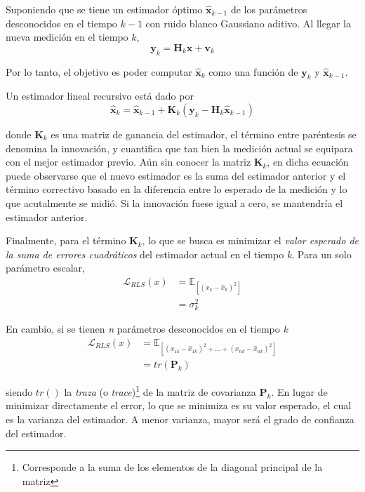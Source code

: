 Suponiendo que se tiene un estimador óptimo $\hat{\bm{x}}_{k-1}$ de los parámetros desconocidos en el tiempo $k-1$ con ruido blanco Gaussiano aditivo. Al llegar la nueva medición en el tiempo $k$,
\begin{equation}
    \bm{y}_k = \bm{H}_k \bm{x} + \bm{v}_k
\end{equation}

Por lo tanto, el objetivo es poder computar $\hat{\bm{x}}_k$ como una función de $\bm{y}_k$ y $\hat{\bm{x}}_{k-1}$.

Un estimador lineal recursivo está dado por
\begin{equation}
    \hat{\bm{x}}_k = \hat{\bm{x}}_{k-1} + \bm{K}_k (\bm{y}_k - \bm{H}_k \hat{\bm{x}}_{k-1})
\end{equation}

donde $\bm{K}_k$ es una matriz de ganancia del estimador, el término entre paréntesis se denomina la innovación, y cuantifica que tan bien la medición actual se equipara con el mejor estimador previo. Aún sin conocer la matriz $\bm{K}_k$, en dicha ecuación puede observarse que el nuevo estimador es la suma del estimador anterior y el término correctivo basado en la diferencia entre lo esperado de la medición y lo que acutalmente se midió. Si la innovación fuese igual a cero, se mantendría el estimador anterior.

Finalmente, para el término $\bm{K}_k$, lo que se busca es minimizar el \textit{valor esperado de la suma de errores cuadráticos} del estimador actual en el tiempo \textit{k}. Para un solo parámetro escalar,
\begin{align}
    \mathscr{L}_{RLS}(x) &= \mathbb{E}_{[(x_k - \hat{x}_k)^2]} \\
                         &= \sigma_k^2
\end{align}

En cambio, si se tienen \textit{n} parámetros desconocidos en el tiempo \textit{k}
\begin{align}
    \mathscr{L}_{RLS}(x) &= \mathbb{E}_{[(x_{1k} - \hat{x}_{1k})^2 + ... + (x_{nk} - \hat{x}_{nk})^2]} \\
                         &= tr(\bm{P}_k)
\end{align}

siendo $tr()$ la \textit{traza} (o \textit{trace})\footnote{Corresponde a la suma de los elementos de la diagonal principal de la matriz} de la matriz de covarianza $\bm{P}_k$. En lugar de minimizar directamente el error, lo que se minimiza es su valor esperado, el cual es la varianza del estimador. A menor varianza, mayor será el grado de confianza del estimador.

